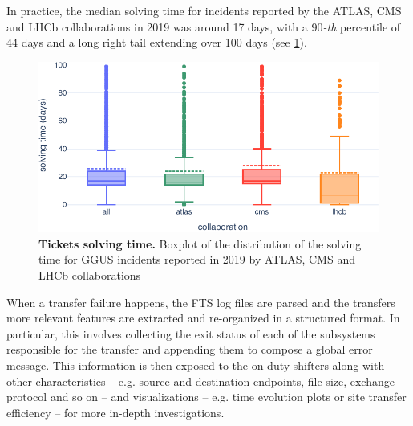 In practice, the median solving time for incidents reported by the ATLAS, CMS and LHCb collaborations in 2019 was around 17 days, with a 90\textit{-th} percentile of 44 days and a long right tail extending over 100 days (see \cref{fig:ggus_time}).
\begin{figure}
    \centering
    \includegraphics[width=\textwidth]{figures/220_introduction/GGUS_time.pdf}
    \caption{\textbf{Tickets solving time.} Boxplot of the distribution of the solving time for GGUS incidents reported in 2019 by ATLAS, CMS and LHCb collaborations}
    \label{fig:ggus_time}
\end{figure}
When a transfer failure happens,
the FTS log files are parsed and the transfers more relevant features are extracted and re-organized in a structured format. 
In particular, this involves collecting the exit status of each of the subsystems responsible for the transfer and appending them to compose a global error message.
This information is then exposed to the on-duty shifters along with other characteristics -- e.g. source and destination endpoints, file size, exchange protocol and so on -- and visualizations -- e.g. time evolution plots or site transfer efficiency -- for more in-depth investigations.


